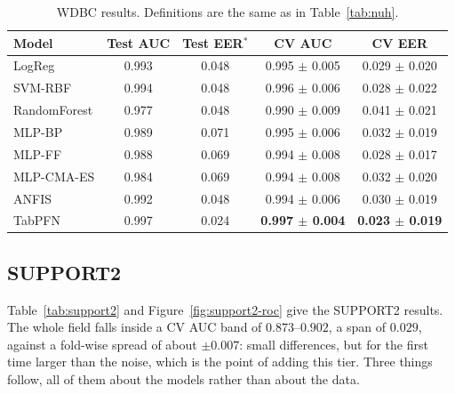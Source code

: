 \documentclass[11pt,a4paper]{article}
\begin{document}
\begin{table}[htbp]
\centering\small
\caption{WDBC results. Definitions are the same as in Table~\ref{tab:nuh}.}
\label{tab:wdbc}
\setlength{\tabcolsep}{8pt}
\begin{tabular}{lcccc}
\toprule
Model & Test AUC & Test EER$^{*}$ & CV AUC & CV EER \\
\midrule
LogReg & 0.993 & 0.048 & 0.995 $\pm$ 0.005 & 0.029 $\pm$ 0.020 \\
SVM-RBF & 0.994 & 0.048 & 0.996 $\pm$ 0.006 & 0.028 $\pm$ 0.022 \\
RandomForest & 0.977 & 0.048 & 0.990 $\pm$ 0.009 & 0.041 $\pm$ 0.021 \\
MLP-BP & 0.989 & 0.071 & 0.995 $\pm$ 0.006 & 0.032 $\pm$ 0.019 \\
MLP-FF & 0.988 & 0.069 & 0.994 $\pm$ 0.008 & 0.028 $\pm$ 0.017 \\
MLP-CMA-ES & 0.984 & 0.069 & 0.994 $\pm$ 0.008 & 0.032 $\pm$ 0.020 \\
ANFIS & 0.992 & 0.048 & 0.994 $\pm$ 0.006 & 0.030 $\pm$ 0.019 \\
TabPFN & 0.997 & 0.024 & \textbf{0.997 $\pm$ 0.004} & \textbf{0.023 $\pm$ 0.019} \\
\bottomrule
\end{tabular}
\end{table}

\FloatBarrier
\subsection{SUPPORT2}
\label{sec:support2-results}
Table~\ref{tab:support2} and Figure~\ref{fig:support2-roc} give the SUPPORT2 results. The whole field falls inside a CV AUC band of $0.873$--$0.902$, a span of $0.029$, against a fold-wise spread of about $\pm0.007$: small differences, but for the first time larger than the noise, which is the point of adding this tier. Three things follow, all of them about the models rather than about the data.
\end{document}
